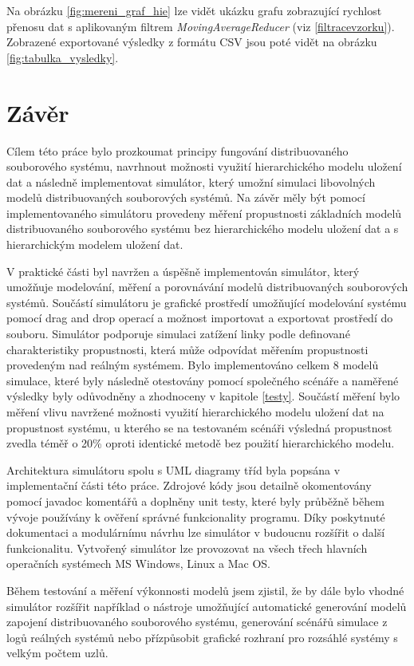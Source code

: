 \documentclass[czech,DP]{thesiskiv}
\begin{document}
Na obrázku \ref{fig:mereni_graf_hie} lze vidět ukázku grafu zobrazující rychlost přenosu dat s aplikovaným filtrem \textit{MovingAverageReducer} (viz \ref{filtracevzorku}). Zobrazené exportované výsledky z formátu CSV jsou poté vidět na obrázku \ref{fig:tabulka_vysledky}.

\chapter{Závěr}

Cílem této práce bylo prozkoumat principy fungování distribuovaného souborového systému, navrhnout možnosti využití hierarchického modelu uložení dat a následně implementovat simulátor, který umožní simulaci libovolných modelů distribuovaných souborových systémů. Na závěr měly být pomocí implementovaného simulátoru provedeny měření propustnosti základních modelů distribuovaného souborového systému bez hierarchického modelu uložení dat a s hierarchickým modelem uložení dat.

V praktické části byl navržen a úspěšně implementován simulátor, který umožňuje modelování, měření a porovnávání modelů distribuovaných souborových systémů. Součástí simulátoru je grafické prostředí umožňující modelování systému pomocí drag and drop operací a možnost importovat a exportovat prostředí do souboru. Simulátor podporuje simulaci zatížení linky podle definované charakteristiky propustnosti, která může odpovídat měřením propustnosti provedeným nad reálným systémem. Bylo implementováno celkem 8 modelů simulace, které byly následně otestovány pomocí společného scénáře a naměřené výsledky byly odůvodněny a zhodnoceny v kapitole \ref{testy}. Součástí měření bylo měření vlivu navržené možnosti využití hierarchického modelu uložení dat na propustnost systému, u kterého se na testovaném scénáři výsledná propustnost zvedla téměř o 20\% oproti identické metodě bez použití hierarchického modelu.

Architektura simulátoru spolu s UML diagramy tříd byla popsána v implementační části této práce. Zdrojové kódy jsou detailně okomentovány pomocí javadoc komentářů a doplněny unit testy, které byly průběžně během vývoje používány k ověření správné funkcionality programu. Díky poskytnuté dokumentaci a modulárnímu návrhu lze simulátor v budoucnu rozšířit o další funkcionalitu. Vytvořený simulátor lze provozovat na všech třech hlavních operačních systémech MS Windows, Linux a Mac OS.

Během testování a měření výkonnosti modelů jsem zjistil, že by dále bylo vhodné simulátor rozšířit například o nástroje umožňující automatické generování modelů zapojení distribuovaného souborového systému, generování scénářů simulace z logů reálných systémů nebo přízpůsobit grafické rozhraní pro rozsáhlé systémy s velkým počtem uzlů.
\end{document}
